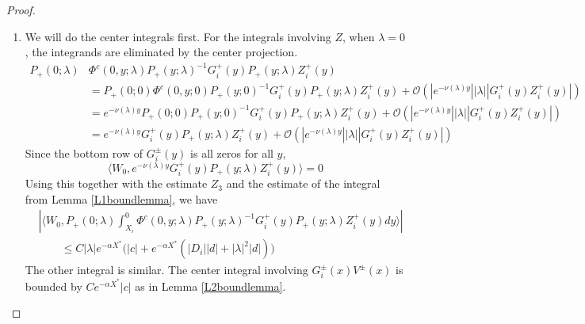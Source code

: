 \documentclass[thesis.tex]{subfiles}
\begin{document}
\begin{lemma}
\begin{proof}
\begin{enumerate}
\item We will do the center integrals first. For the integrals involving $Z$, when $\lambda = 0$, the integrands are eliminated by the center projection. 
\begin{align*}
P_+(0; \lambda) &\Phi^c(0, y; \lambda) P_+(y; \lambda)^{-1} G_i^+(y) P_+(y; \lambda) Z_i^+(y) \\
&= P_+(0; 0) \Phi^c(0, y; 0) P_+(y; 0)^{-1} G_i^+(y) P_+(y; \lambda) Z_i^+(y) + \mathcal{O}(|e^{-\nu(\lambda) y}||\lambda||G_i^+(y) Z_i^+(y)|) \\
&= e^{-\nu(\lambda) y} P_+(0; 0) P_+(y; 0)^{-1} G_i^+(y) P_+(y; \lambda) Z_i^+(y) + \mathcal{O}(|e^{-\nu(\lambda) y}||\lambda||G_i^+(y) Z_i^+(y)|) \\
&= e^{-\nu(\lambda) y} G_i^+(y) P_+(y; \lambda) Z_i^+(y) + \mathcal{O}(|e^{-\nu(\lambda) y}||\lambda||G_i^+(y) Z_i^+(y)|)
\end{align*}
Since the bottom row of $G_i^\pm(y)$ is all zeros for all $y$, 
\[
\langle W_0, e^{-\nu(\lambda) y} G_i^+(y) P_+(y; \lambda) Z_i^+(y) \rangle = 0
\]
Using this together with the estimate $Z_3$ and the estimate of the integral from Lemma \ref{L1boundlemma}, we have
\begin{align*}
&\left| \langle W_0, P_+(0; \lambda) \int_{X_i}^0 \Phi^c(0, y; \lambda) P_+(y; \lambda)^{-1} G_i^+(y) P_+(y; \lambda) Z_i^+(y) dy \rangle \right| \\
&\qquad \leq C |\lambda| e^{-\alpha X^*}\Big(|c| + e^{-\alpha X^*}\left(|D_i||d| + |\lambda|^2|d|\right) \Big)
\end{align*}
The other integral is similar. The center integral involving $G_i^\pm(x) V^\pm(x)$ is bounded by $C e^{-\alpha X^*}|c|$ as in Lemma \ref{L2boundlemma}.


\end{enumerate}
\end{proof}
\end{lemma}
\end{document}
